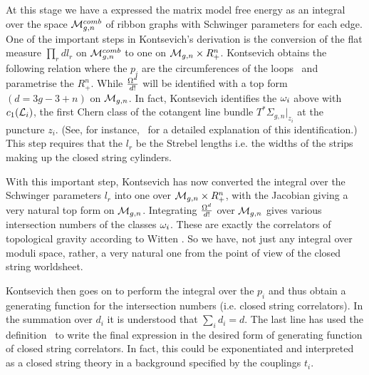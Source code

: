 At this stage we have a expressed the matrix model free energy as an
integral over the space ${\cal M}_{g,n}^{comb}$
of ribbon graphs with Schwinger parameters for each edge.  
One of the important steps in Kontsevich's derivation is the conversion
of the flat measure $\prod_r dl_r$ on ${\cal M}_{g,n}^{comb}$
to one on ${\cal M}_{g,n}\times R_+^n$. 
Kontsevich obtains the following relation
\eqn{}
where the $p_i$ are the circumferences of the loops \pa\ and
parametrise the $R_+^n$. While ${{\Omega}^d\over d!}$ will be identified 
with a top form $(d=3g-3+n)$ on ${\cal M}_{g,n}$. In fact,  
\eqn{}
Kontsevich identifies the ${\omega}_i$ above with $c_1({\cal L}_i)$, the first 
Chern class of the cotangent line bundle $T^*\Sigma_{g,n}|_{z_i}$ at the 
puncture $z_i$. (See, for instance, \zvon\ for a 
detailed explanation of this identification.)
This step requires that the $l_r$ be the 
Strebel lengths i.e. the widths of the strips making up
the closed string cylinders. 

With this important step, Kontsevich has now converted the integral 
over the Schwinger parameters $l_r$ into one over 
${\cal M}_{g,n}\times R_+^n$, with the Jacobian giving a very
natural top form on ${\cal M}_{g,n}$. Integrating ${{\Omega}^d\over d!}$
over  ${\cal M}_{g,n}$ gives various intersection numbers of 
the classes ${\omega}_i$. These are exactly the correlators of topological 
gravity according to Witten \wittop . So we have, not just any integral 
over moduli space, rather, a very natural one from the point of 
view of the closed string worldsheet. 

Kontsevich then goes on to perform the integral over the $p_i$ and thus
obtain a generating function for the intersection numbers (i.e. closed string 
correlators).
\eqn{}
In the summation over $d_i$ it is understood that $\sum_{i}d_i=d$.
The last line has used the definition \miwa\ to write the final
expression in the desired form of 
generating function of closed string correlators. 
In fact, this could
be exponentiated and interpreted as a closed string theory in a background 
specified by the couplings $t_i$.

